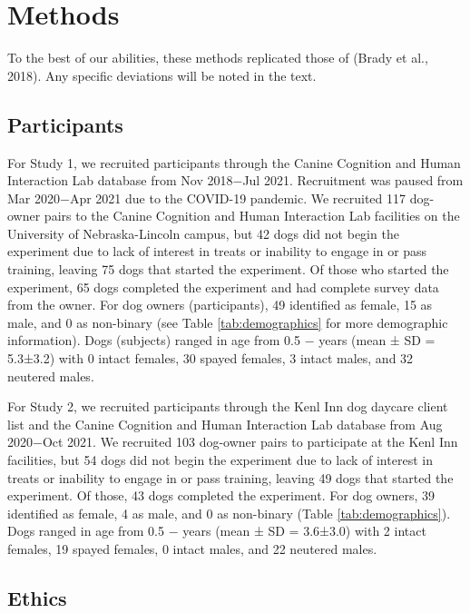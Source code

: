 \documentclass[
  pub,floatsintext]{apa6}
\begin{document}
\hypertarget{methods}{%
\section{Methods}\label{methods}}

To the best of our abilities, these methods replicated those of (Brady et al., 2018). Any specific deviations will be noted in the text.

\hypertarget{participants}{%
\subsection{Participants}\label{participants}}

For Study 1, we recruited participants through the Canine Cognition and Human Interaction Lab database from Nov 2018\(-\)Jul 2021. Recruitment was paused from Mar 2020\(-\)Apr 2021 due to the COVID-19 pandemic. We recruited 117 dog-owner pairs to the Canine Cognition and Human Interaction Lab facilities on the University of Nebraska-Lincoln campus, but 42 dogs did not begin the experiment due to lack of interest in treats or inability to engage in or pass training, leaving 75 dogs that started the experiment. Of those who started the experiment, 65 dogs completed the experiment and had complete survey data from the owner. For dog owners (participants), 49 identified as female, 15 as male, and 0 as non-binary (see Table \ref{tab:demographics} for more demographic information). Dogs (subjects) ranged in age from 0.5 \negthickspace \(-\)  years (mean ± SD = 5.3±3.2) with 0 intact females, 30 spayed females, 3 intact males, and 32 neutered males.

For Study 2, we recruited participants through the Kenl Inn dog daycare client list and the Canine Cognition and Human Interaction Lab database from Aug 2020\(-\)Oct 2021. We recruited 103 dog-owner pairs to participate at the Kenl Inn facilities, but 54 dogs did not begin the experiment due to lack of interest in treats or inability to engage in or pass training, leaving 49 dogs that started the experiment. Of those, 43 dogs completed the experiment. For dog owners, 39 identified as female, 4 as male, and 0 as non-binary (Table \ref{tab:demographics}). Dogs ranged in age from 0.5 \negthickspace \(-\)  years (mean ± SD = 3.6±3.0) with 2 intact females, 19 spayed females, 0 intact males, and 22 neutered males.

\hypertarget{ethics}{%
\subsection{Ethics}\label{ethics}}
\end{document}
